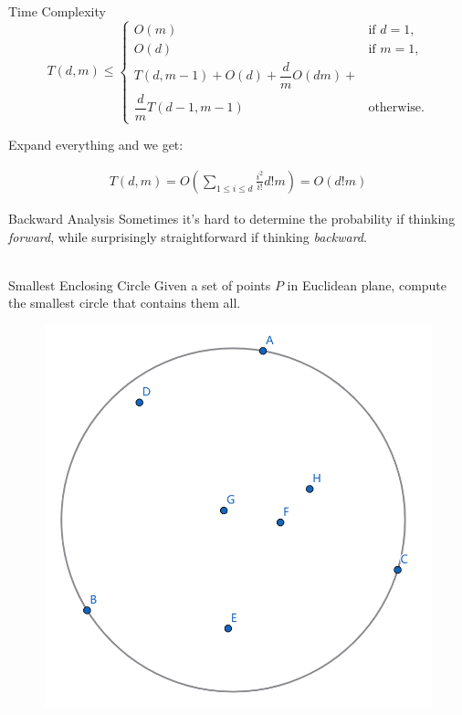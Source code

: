 \documentclass{beamer}
\newcommand{\lf}{\left[}
\newcommand{\rf}{\right]}
\begin{document}
\begin{frame}{Time Complexity}
\[
T(d, m) \le 
\begin{cases}
  O(m) & \text{if } d = 1, \\
  O(d) & \text{if } m = 1, \\
  T(d, m - 1) + O(d) + \dfrac{d}{m} O(dm) + \\
  \dfrac{d}{m} T(d - 1, m - 1) & \text{otherwise}.
\end{cases}
\]

Expand everything and we get:

\begin{align*}
    T(d, m) = O(\sum_{1\le i \le d} \frac{i^2}{i!} d! m) = O(d! m)
\end{align*}

\end{frame}
\begin{frame}{Backward Analysis}
	Sometimes it's hard to determine the probability if thinking \textit{forward}, while surprisingly straightforward if thinking \textit{backward}. \\~\

	\begin{block}{Smallest Enclosing Circle}
		Given a set of points $P$ in Euclidean plane, compute the smallest circle that contains them all.
	\end{block}

	\begin{figure}[r]
		\includegraphics[width=0.4\linewidth]{pics/smallest_enclosing_circle_illustration.png}
	\end{figure}




\end{frame}
\end{document}
